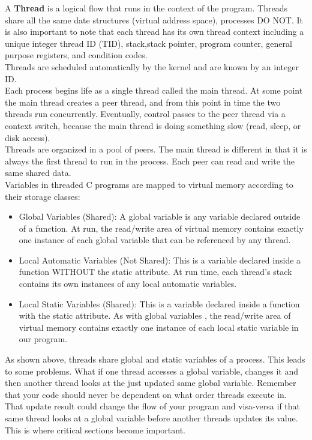 

A {\bf Thread} is a logical flow that runs in the context of the program.  Threads share all the same date structures (virtual address space), processes DO NOT.  It is also important to note that each thread has its own thread context including a unique integer thread ID (TID), stack,stack pointer, program counter, general purpose registers, and condition codes.\\

Threads  are scheduled automatically by the kernel and are known by an integer ID.\\
Each process begins life as a single thread called the main thread.  At some point the main thread creates a peer thread, and from this point in time the two threads run concurrently.  Eventually, control passes to the peer thread via a context switch, because the main thread is doing something slow (read, sleep, or disk access).\\

Threads are organized in a pool of peers.  The main thread is different in that it is always the first thread to run in the process.  Each peer can read and write the same shared data.\\

Variables in threaded C programs are mapped to virtual memory according to their storage classes:
\begin{itemize}
\item Global Variables (Shared):  A global variable is any variable declared outside of a function.  At run, the read/write area of virtual memory contains exactly one instance of each global variable that can be referenced by any thread.
\item Local Automatic Variables (Not Shared): This is a variable declared inside a function WITHOUT the static attribute.  At run time, each thread's stack contains its own instances of any local automatic variables.
\item Local Static Variables (Shared):  This is a variable declared inside a function with the static attribute.  As with global variables , the read/write area of virtual memory contains exactly one instance of each local static variable in our program.
\end{itemize}


As shown above, threads share global and static variables of a process.  This leads to some problems.  What if one thread accesses a global variable, changes it and then another thread looks at the just updated same global variable.  Remember that your code should never be dependent on what order threads execute in.  That update result could change the flow of your program and visa-versa if that same thread looks at a global variable before another threads updates its value.  This is where critical sections become important.\\

